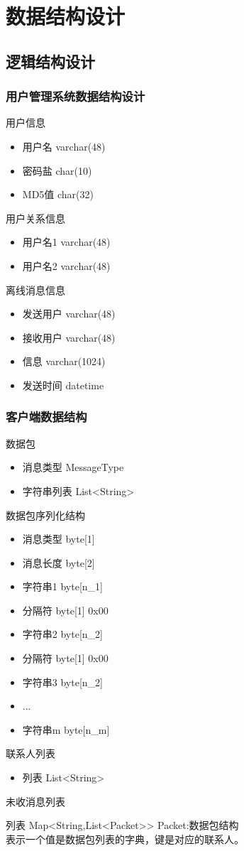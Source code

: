 \chapter{数据结构设计}
\section{逻辑结构设计}
\subsection{用户管理系统数据结构设计}
用户信息
	\begin{itemize}  	
		\item 用户名 varchar(48)
		\item 密码盐 char(10)
		\item MD5值 char(32)
	\end{itemize}
用户关系信息
	\begin{itemize}  	
		\item 用户名1 varchar(48)
		\item 用户名2 varchar(48)
\end{itemize}
离线消息信息
	\begin{itemize}
		\item 发送用户 varchar(48)
		\item 接收用户 varchar(48)
		\item 信息     varchar(1024)
		\item 发送时间 datetime
	\end{itemize}	
\subsection{客户端数据结构}
数据包
	\begin{itemize}
		\item 消息类型 MessageType
		\item 字符串列表 List<String>
	\end{itemize}	
数据包序列化结构
	\begin{itemize}
		\item 消息类型 byte[1]
		\item 消息长度 byte[2]
		\item 字符串1  byte[n_1]
		\item 分隔符   byte[1] 0x00 
		\item 字符串2  byte[n_2]
		\item 分隔符   byte[1] 0x00
		\item 字符串3  byte[n_2]
		\item ...
		\item 字符串m  byte[n_m]
\end{itemize}	
联系人列表
\begin{itemize}
	\item 列表 List<String>
\end{itemize}
未收消息列表
	\item 列表 Map<String,List<Packet>> Packet:数据包结构\\
	表示一个值是数据包列表的字典，键是对应的联系人。
